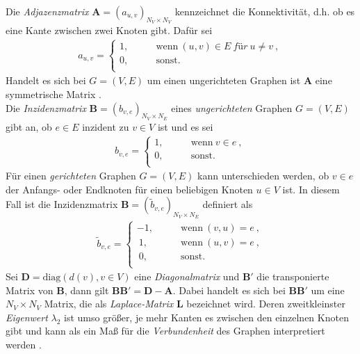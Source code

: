 \documentclass[12pt, a4paper]{report}\usepackage[]{graphicx}\usepackage[]{color}
\begin{document}
Die \textit{Adjazenzmatrix} $\textbf{A}=(a_{u,v})_{N_V \times N_V}$ kennzeichnet die Konnektivität, d.h. ob es eine Kante zwischen zwei Knoten gibt. Dafür sei 
\begin{align}\label{Eq_Adjazenzmatrix}
a_{u,v} = \begin{cases}
1, \qquad &\text{wenn} \ (u,v) \in E \ \textit{für} \ u \neq v \ ,\\
0, \qquad &\text{sonst.}\\
\end{cases}
\end{align}
Handelt es sich bei $G=(V,E)$ um einen ungerichteten Graphen ist $\textbf{A}$ eine symmetrische Matrix \cite{kolaczyk2009statistical}.\\
Die \textit{Inzidenzmatrix} $\textbf{B}=(b_{v,e})_{N_V \times N_E}$ eines \textit{ungerichteten} Graphen $G=(V,E)$ gibt an, ob $e \in E$ inzident zu $v \in V$ ist \cite{kolaczyk2009statistical} und es sei
\begin{align}\label{Eq_Inzidenzmatrix_unger}
b_{v,e} = \begin{cases}
1, \qquad &\text{wenn} \ v \in e \ ,\\
0, \qquad &\text{sonst.}\\
\end{cases}
\end{align}
Für einen \textit{gerichteten} Graphen $G=(V,E)$ kann unterschieden werden, ob $v \in e$ der Anfangs- oder Endknoten für einen beliebigen Knoten $u \in V$ ist. In diesem Fall ist die Inzidenzmatrix $\textbf{\~B}=(\tilde{b}_{v,e})_{N_V \times N_E}$ definiert \cite{brandes2005graphfunda} als
\begin{align}\label{Eq_Inzidenzmatrix_ger}
\tilde{b}_{v,e} = \begin{cases}
-1, \qquad &\text{wenn} \ (v,u) = e \  ,\\
\ 1, \qquad &\text{wenn} \ (u,v) = e \ ,\\
\ 0, \qquad &\text{sonst.}\\
\end{cases}
\end{align}
Sei $\textbf{D}=\text{diag}(d(v), v \in V)$ eine \textit{Diagonalmatrix} und $\textbf{\~B}'$ die transponierte Matrix von $\textbf{\~B}$, dann gilt $\textbf{\~B\~B}'=\textbf{D}-\textbf{A}$. Dabei handelt es sich bei $\textbf{\~B\~B}'$ um eine $N_V \times N_V$ Matrix, die als \textit{Laplace-Matrix} $\textbf{L}$ bezeichnet wird. Deren zweitkleinster \textit{Eigenwert} $\lambda_2$ ist umso größer, je mehr Kanten es zwischen den einzelnen Knoten gibt und kann als ein Maß für die \textit{Verbundenheit} des Graphen interpretiert werden \cite{kolaczyk2009statistical}.\\ 
\begin{comment}
Für die \textit{normierte Laplace-Matrix} $\textbf{\~L}$ gilt $\textbf{\~L}=\textbf{D}^{1/2}\textbf{L}\textbf{D}^{1/2}$, wobei $\textbf{D}^{1/2}=\text{diag}\frac{1}{\sqrt{d(v)}}$ für $d(v) \neq 0$ und ansonsten $0$ ist \cite{brandes2005graphfunda}.
\end{comment}
\end{document}
